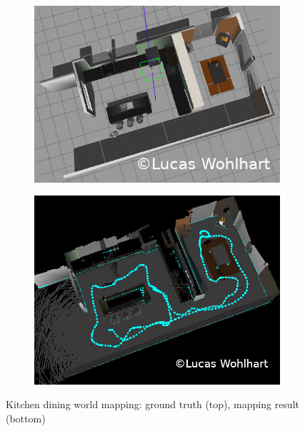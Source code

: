 \documentclass[10pt,journal,compsoc]{IEEEtran}
\begin{document}
\begin{figure}
    \centering
    \begin{subfigure}[b]{0.45\textwidth}
        \includegraphics[width=\linewidth]{img/kitchen_map_ground_truth.png}
        \label{fig:kitchen_map_ground_truth}
    \end{subfigure}
    
    \begin{subfigure}[b]{0.45\textwidth}
        \includegraphics[width=\linewidth]{img/kitchen_map.png}
        \label{fig:kitchen_map}
    \end{subfigure}
    \caption{Kitchen dining world mapping: ground truth (top), mapping result (bottom)}    
\end{figure}
\end{document}
